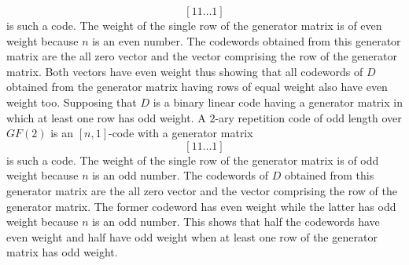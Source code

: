 \[
	\left[11\ldots1\right]
\]
is such a code. The weight of the single row of the generator matrix is of even weight because $n$ is an even number. The codewords obtained from this generator matrix are the all zero vector and the vector comprising the row of the generator matrix.  Both vectors have even weight thus showing that all codewords of $D$ obtained from the generator matrix having rows of equal weight also have even weight too.
\qsubpart
Supposing that $D$ is a binary linear code having a generator matrix
in which at least one row has odd weight. A $2$-ary repetition code of odd length over $GF(2)$ is an $[n,1]$-code with a generator matrix
\[
	\left[11\ldots1\right]
\]
is such a code. The weight of the single row of the generator matrix is of odd weight because $n$ is an odd number. The codewords of $D$ obtained from this generator matrix are the all zero vector and the vector comprising the row of the generator matrix.  The former codeword has even weight while the latter has odd weight because $n$ is an odd number.  This shows that half the codewords have even weight and half have odd weight when at least one row of the generator matrix has odd weight.